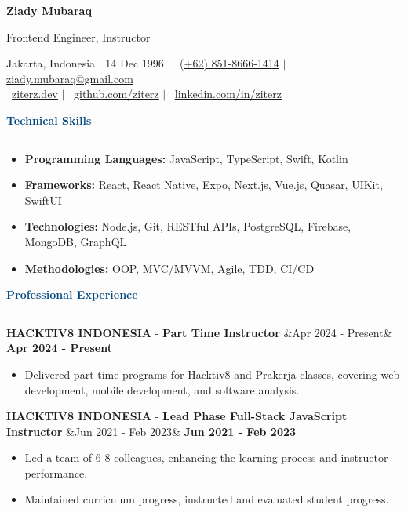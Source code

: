 \documentclass{article}
\newcommand{\header}[1]{
	\vspace{2mm}
	{\large \noindent \textcolor[HTML]{004780}{\textbf{#1}}}
	\vspace{0.5mm}
	\hrule
	\vspace{1.5mm}
}
\newcommand{\skillsheader}[1]{
	\vspace{2mm}
	{\large \noindent \textcolor[HTML]{004780}{\textbf{#1}}}
	\vspace{1.5mm}
	\hrule
	\vspace{1.5mm}
}
\newcommand{\longitem}[4]{
	\begin{adjustwidth}{}{}
		\MakeUppercase{\textbf{#1}} - \textbf{#3} \hfill \ifx&#2& \else \textbf{#2} \fi \\
	\end{adjustwidth}
	\vspace{-1mm}
}
\newcommand{\skills}[1]{%
	\begin{itemize}[leftmargin=*]\leftskip=0.5em
		\setlength\itemsep{-1mm}
		\vspace{-1mm}
		#1
	\end{itemize}%
}
\newcommand{\liststart}{\begin{itemize}[leftmargin=*]\leftskip=0.5em\vspace{-5mm}}
\newcommand{\listend}{\end{itemize}\vspace{0.2mm}}
\begin{document}
	\begin{flushleft}
		{\LARGE \textbf{Ziady Mubaraq}} \\

		\vspace{1mm}

		{\large Frontend Engineer, Instructor}

		\vspace{1mm}
		
		Jakarta, Indonesia  $\mid$ 14 Dec 1996 $\mid$ \faWhatsapp ~\href{https://wa.me/6285186661414}{\underline{(+62) 851-8666-1414}} $\mid$ \faEnvelope[regular] \href{mailto:ziady.mubaraq@gmail.com}{\underline{ziady.mubaraq@gmail.com}} \\
		\faLink ~\href{https://ziterz.dev}{\underline{ziterz.dev}}  $\mid$ \faGithub ~\href{https://github.com/ziterz}{\underline{github.com/ziterz}} $\mid$ \faLinkedin ~\href{https://linkedin.com/in/ziterz}{\underline{linkedin.com/in/ziterz}}
	\end{flushleft}

	\vspace{-1mm}

	\skillsheader{Technical Skills}
	\skills{
		\item \textbf{Programming Languages:} JavaScript, TypeScript, Swift, Kotlin
		\item \textbf{Frameworks:} React, React Native, Expo, Next.js, Vue.js, Quasar, UIKit, SwiftUI
		\item \textbf{Technologies:} Node.js, Git, RESTful APIs, PostgreSQL, Firebase, MongoDB, GraphQL
		\item \textbf{Methodologies:} OOP, MVC/MVVM, Agile, TDD, CI/CD
	}		

	\header{Professional Experience}
		\longitem{Hacktiv8 Indonesia}{Apr 2024 - Present}{Part Time Instructor}{}
		\liststart
			\item Delivered part-time programs for Hacktiv8 and Prakerja classes, covering web development, mobile development, and software analysis.
		\listend

		\longitem{Hacktiv8 Indonesia}{Jun 2021 - Feb 2023}{Lead Phase Full-Stack JavaScript Instructor}{}
		\liststart
			\item Led a team of 6-8 colleagues, enhancing the learning process and instructor performance. \vspace{-1mm}
			\item Maintained curriculum progress, instructed and evaluated student progress.
		\listend
\end{document}

